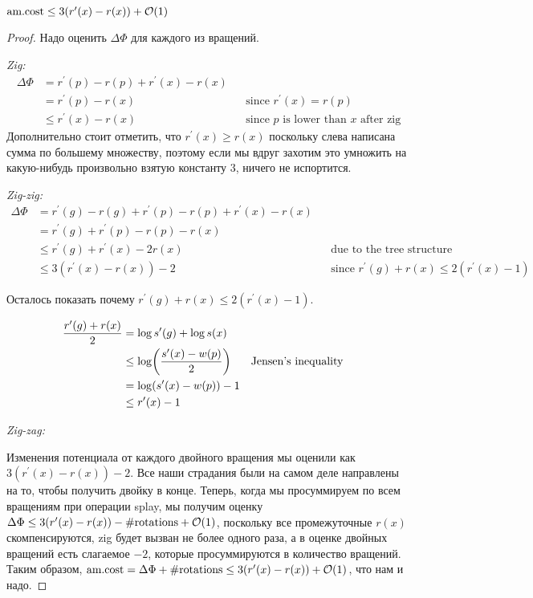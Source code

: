 \begin{theorem}
    $\text{am.cost} \leq 3(r^\prime(x) - r(x)) + \mathcal{O}(1)$
\end{theorem}
\begin{proof}
    Надо оценить $\Delta\Phi$ для каждого из вращений.

    {\it Zig:}
    \begin{align*}
        \Delta\Phi & = r^\prime(p) - r(p) + r^\prime(x) - r(x) \\
        & = r^\prime(p) - r(x) && \text{since $r^\prime(x) = r(p)$} \\
        & \leq r^\prime(x) - r(x) && \text{since $p$ is lower than $x$ after zig}
    \end{align*}
    Дополнительно стоит отметить, что $r^\prime(x) \geq r(x)$ поскольку слева написана сумма по большему множеству, поэтому если мы вдруг захотим это умножить на какую-нибудь произвольно взятую константу $3$, ничего не испортится.

    {\it Zig-zig:}
    \begin{align*}
        \Delta\Phi & = r^\prime(g) - r(g) + r^\prime(p) - r(p) + r^\prime(x) - r(x) \\
        & = r^\prime(g) + r^\prime(p) - r(p) - r(x) \\
        & \leq r^\prime(g) + r^\prime(x) - 2 r(x) && \text{due to the tree structure} \\
        & \leq 3 (r^\prime(x) - r(x)) - 2 && \text{since $r^\prime(g) + r(x) \leq 2(r^\prime(x) - 1)$}
    \end{align*}

    Осталось показать почему $r^\prime(g) + r(x) \leq 2(r^\prime(x) - 1)$.

    \begin{align*}
        \frac{r^\prime(g) + r(x)}{2} & = \log s^\prime(g) + \log s(x) \\
        & \leq \log \parens*{ \frac{s^\prime(x) - w(p)}{2} } && \text{Jensen's inequality} \\
        & = \log \parens*{s^\prime (x) - w(p)} - 1 \\
        & \leq r^\prime(x) - 1
    \end{align*}

    {\it Zig-zag:}

    Изменения потенциала от каждого двойного вращения мы оценили как $3(r^\prime(x) - r(x)) - 2$. Все наши страдания были на самом деле направлены на то, чтобы получить двойку в конце. Теперь, когда мы просуммируем по всем вращениям при операции splay, мы получим оценку $\Delta\Phi \leq 3(r^\prime(x) - r(x)) - \#\text{rotations} + \mathcal{O}(1)$, поскольку все промежуточные $r(x)$ скомпенсируются, zig будет вызван не более одного раза, а в оценке двойных вращений есть слагаемое $-2$, которые просуммируются в количество вращений. Таким образом, $\text{am.cost} = \Delta\Phi + \#\text{rotations} \leq 3(r^\prime(x) - r(x)) + \mathcal{O}(1)$, что нам и надо.
\end{proof}

